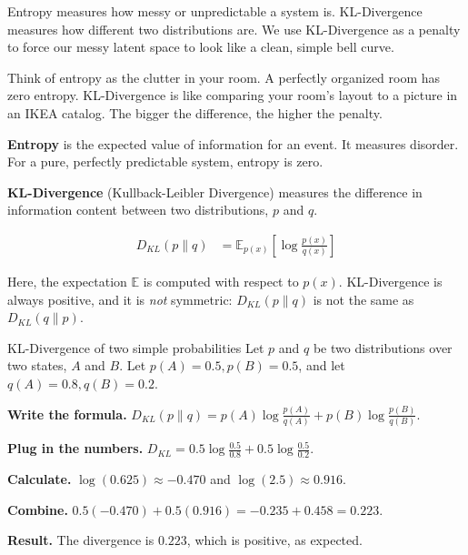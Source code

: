 \documentclass[a4paper,11pt]{article}
\newcommand{\vocab}[1]{\textbf{\color{navy}#1}}
\begin{document}
\begin{intuition}
Entropy measures how messy or unpredictable a system is. KL-Divergence measures how different two distributions are. We use KL-Divergence as a penalty to force our messy latent space to look like a clean, simple bell curve.
\end{intuition}

\begin{everyday}
Think of entropy as the clutter in your room. A perfectly organized room has zero entropy. KL-Divergence is like comparing your room's layout to a picture in an IKEA catalog. The bigger the difference, the higher the penalty.
\end{everyday}

\vocab{Entropy} is the expected value of information for an event. It measures disorder. For a pure, perfectly predictable system, entropy is zero.

\vocab{KL-Divergence} (Kullback-Leibler Divergence) measures the difference in information content between two distributions, $p$ and $q$.

\begin{align}
  D_{KL}(p \parallel q) &= \mathbb{E}_{p(x)} \left[ \log \frac{p(x)}{q(x)} \right]
\end{align}

Here, the expectation $\mathbb{E}$ is computed with respect to $p(x)$. KL-Divergence is always positive, and it is \emph{not} symmetric: $D_{KL}(p \parallel q)$ is not the same as $D_{KL}(q \parallel p)$.

\begin{worked}{KL-Divergence of two simple probabilities}
Let $p$ and $q$ be two distributions over two states, $A$ and $B$. Let $p(A) = 0.5, p(B) = 0.5$, and let $q(A) = 0.8, q(B) = 0.2$.
\begin{steps}
  \item \textbf{Write the formula.} $D_{KL}(p \parallel q) = p(A) \log \frac{p(A)}{q(A)} + p(B) \log \frac{p(B)}{q(B)}$.
  \item \textbf{Plug in the numbers.} $D_{KL} = 0.5 \log \frac{0.5}{0.8} + 0.5 \log \frac{0.5}{0.2}$.
  \item \textbf{Calculate.} $\log(0.625) \approx -0.470$ and $\log(2.5) \approx 0.916$.
  \item \textbf{Combine.} $0.5(-0.470) + 0.5(0.916) = -0.235 + 0.458 = 0.223$.
  \item \textbf{Result.} The divergence is $0.223$, which is positive, as expected.
\end{steps}
\end{worked}
\end{document}
